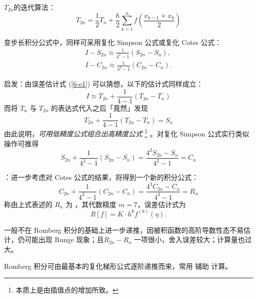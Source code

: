 \entry $T_{2n}$的迭代算法：
\begin{equation}
T_{2n}=\frac12T_n+\frac h2\sum_{k=1}^nf\left(\frac{x_{k-1}+x_k}2\right)
\end{equation}

\entry 变步长积分公式中，同样可采用复化 Simpson 公式或复化 Cotes 公式：
\begin{gather}
I-S_{2n}\approx\frac1{4^2-1}(S_{2n}-S_n),\\
I-C_{2n}\approx\frac1{4^3-1}(C_{2n}-C_n).
\end{gather}

\entry 启发：由误差估计式 (\ref{6-e1}) 可以猜想，以下的估计式同样成立：
\[ I\approx T_{2n}+\frac1{4-1}(T_{2n}-T_n) \]
而将 $T_n$ 与 $T_{2n}$ 的表达式代入之后「竟然」发现
\begin{equation}
T_{2n}+\frac1{4-1}(T_{2n}-T_n)=S_n
\end{equation}
由此说明，\emph{可用低精度公式组合出高精度公式}
\footnote{本质上是由插值点的增加所致。}
。对复化 Simpson 公式实行类似操作可推得
\begin{equation}
S_{2n}+\frac1{4^2-1}(S_{2n}-S_n)=\frac{4^2S_{2n}-S_n}{4^2-1}=C_n
\end{equation}


\entry {}：进一步考虑对 Cotes 公式的结果，将得到一个新的积分公式：
\begin{equation}
C_{2n}+\frac1{4^3-1}(C_{2n}-C_n)=\frac{4^3C_{2n}-C_n}{4^3-1}=R_n
\end{equation}
称由上式表述的 $R_n$ 为 ，其代数精度 $m=7$，误差估计式为
\begin{equation}
R[f]=K\cdot h^8f^{(8)}(\eta).
\end{equation}

\entry 一般不在 Romberg 积分的基础上进一步递推，因被积函数的高阶导数性态不易估计，仍可能出现 Runge 现象；且$R_{2n}-R_n$ 一项很小，舍入误差较大；计算量也过大。

\entry Romberg 积分可由最基本的复化梯形公式逐阶递推而来，常用 辅助
计算。

